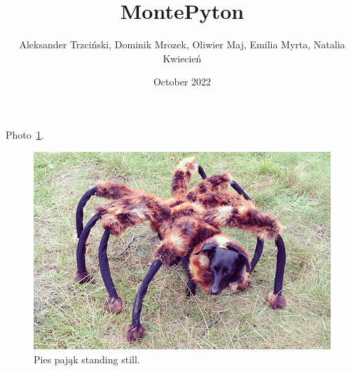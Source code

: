 \documentclass{article}
\title{MontePyton}
\author{Aleksander Trzciński, Dominik Mrozek, Oliwier Maj, Emilia Myrta, Natalia Kwiecień}
\date{October 2022}
\begin{document}
\maketitle


\vspace{0.1cm}

\vspace{0.1cm}

\vspace{0.1cm}

\vspace{0.1cm}


Photo~\ref{fig:piespajak}.
\begin{figure}[htbp]
    \centering
    \includegraphics[width=1\textwidth]{Pictures/piespajak.jpg}
    \caption{Pies pająk standing still.}
    \label{fig:piespajak}
\end{figure}
\end{document}
